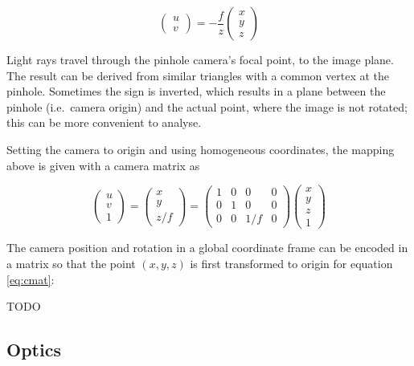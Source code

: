 \begin{equation}
\begin{pmatrix}
u \\ v
\end{pmatrix}
=
-\frac{f}{z} \begin{pmatrix}
x \\ y \\ z
\end{pmatrix}
\end{equation}

Light rays travel through the pinhole camera's focal point, to the image plane.
The result can be derived from similar triangles with a common vertex at the pinhole.
Sometimes the sign is inverted, which results in a plane between the pinhole (i.e.~camera origin) and the actual point, where the image is not rotated; this can be more convenient to analyse.

Setting the camera to origin and using homogeneous coordinates, the mapping above is given with a camera matrix as

\begin{equation}
\begin{pmatrix}
u \\ v \\ 1
\end{pmatrix}
=
\begin{pmatrix}
x \\ y \\ z/f
\end{pmatrix}
=
\begin{pmatrix} \label{eq:cmat}
	1 & 0 & 0 & 0 \\
	0 & 1 & 0 & 0 \\
	0 & 0 & 1/f & 0
\end{pmatrix}
\begin{pmatrix}
x \\ y \\ z \\ 1
\end{pmatrix}
\end{equation}

The camera position and rotation in a global coordinate frame can be encoded in a matrix so that the point $(x,y,z)$ is first transformed to origin for equation \ref{eq:cmat}:

TODO

\subsection{Optics}

